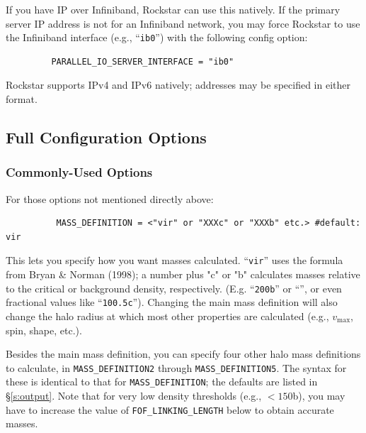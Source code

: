 \documentclass[12pt]{article}
\begin{document}
      If you have IP over Infiniband, Rockstar can use this natively.  If the primary
      server IP address is not for an Infiniband network, you may force Rockstar to use the
      Infiniband interface (e.g., ``\texttt{ib0}'') with the following config option:
\begin{verbatim}
         PARALLEL_IO_SERVER_INTERFACE = "ib0"
\end{verbatim}
      Rockstar supports IPv4 and IPv6 natively; addresses may be specified
      in either format.



\subsection{Full Configuration Options}
\label{s:full_options}

\subsubsection{Commonly-Used Options}
\label{s:common_options}
      For those options not mentioned directly above:
\begin{verbatim}
      	  MASS_DEFINITION = <"vir" or "XXXc" or "XXXb" etc.> #default: vir
\end{verbatim}
      This lets you specify how you want masses calculated.  ``\texttt{vir}'' uses the
      formula from Bryan \& Norman (1998); a number plus "c" or "b" calculates
      masses relative to the critical or background density, respectively.
      (E.g. ``\texttt{200b}'' or ``'', or even fractional values like ``\texttt{100.5c}'').
      Changing the main mass definition will also change the halo radius at which most other
      properties are calculated (e.g., $v_\mathrm{max}$, spin, shape, etc.).
      
      Besides the main mass definition, you can specify four other halo mass definitions to calculate,
      in \texttt{MASS\_DEFINITION2} through \texttt{MASS\_DEFINITION5}.  The syntax for these is
      identical to that for \texttt{MASS\_DEFINITION}; the defaults are listed in \S \ref{s:output}.  Note that
      for very low density thresholds (e.g., $<150$b), you may have to increase the value of \texttt{FOF\_LINKING\_LENGTH} below to obtain accurate masses.
\end{document}
